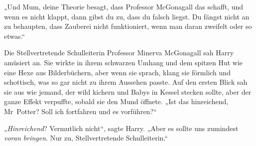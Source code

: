 „Und Mum, deine Theorie besagt, dass Professor McGonagall das schafft, und wenn es nicht klappt, dann gibst du zu, dass du falsch liegst. Du fängst nicht an zu behaupten, dass Zauberei nicht funktioniert, wenn man daran zweifelt oder so etwas.“

Die Stellvertretende Schulleiterin Professor Minerva McGonagall sah Harry amüsiert an. Sie wirkte in ihrem schwarzen Umhang und dem spitzen Hut wie eine Hexe aus Bilderbüchern, aber wenn sie sprach, klang sie förmlich und schottisch, was so gar nicht zu ihrem Aussehen passte. Auf den ersten Blick sah sie aus wie jemand, der wild kichern und Babys in Kessel stecken sollte, aber der ganze Effekt verpuffte, sobald sie den Mund öffnete.
„Ist das hinreichend, Mr~Potter? Soll ich fortfahren und es vorführen?“

„\emph{Hinreichend}? Vermutlich nicht“, sagte Harry.
„Aber es sollte uns zumindest \emph{voran bringen}. Nur zu, Stellvertretende Schulleiterin.“

